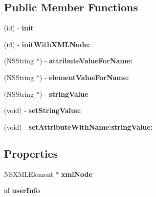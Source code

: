 \subsection*{Public Member Functions}
\begin{DoxyCompactItemize}
\item 
\hypertarget{interface_c_g_xml_node_ad90b29bc2d65ce4b349ecab18db6a3e4}{(id) -\/ {\bfseries init}}\label{interface_c_g_xml_node_ad90b29bc2d65ce4b349ecab18db6a3e4}

\item 
\hypertarget{interface_c_g_xml_node_acee52fdfbc894dfc20d3dcc5e2ff942a}{(id) -\/ {\bfseries init\-With\-X\-M\-L\-Node\-:}}\label{interface_c_g_xml_node_acee52fdfbc894dfc20d3dcc5e2ff942a}

\item 
\hypertarget{interface_c_g_xml_node_acd08c6d9d64e3c7dee41be31543db633}{(N\-S\-String $\ast$) -\/ {\bfseries attribute\-Value\-For\-Name\-:}}\label{interface_c_g_xml_node_acd08c6d9d64e3c7dee41be31543db633}

\item 
\hypertarget{interface_c_g_xml_node_a655323c5db995c6f1584e00de2b0cae6}{(N\-S\-String $\ast$) -\/ {\bfseries element\-Value\-For\-Name\-:}}\label{interface_c_g_xml_node_a655323c5db995c6f1584e00de2b0cae6}

\item 
\hypertarget{interface_c_g_xml_node_a176e7da0a7ebf7621b884af50694f3a2}{(N\-S\-String $\ast$) -\/ {\bfseries string\-Value}}\label{interface_c_g_xml_node_a176e7da0a7ebf7621b884af50694f3a2}

\item 
\hypertarget{interface_c_g_xml_node_a1dcaecf10b29c55303235f5af3ea7a0e}{(void) -\/ {\bfseries set\-String\-Value\-:}}\label{interface_c_g_xml_node_a1dcaecf10b29c55303235f5af3ea7a0e}

\item 
\hypertarget{interface_c_g_xml_node_a4de8210ccd53cd0efff2c2ffb236ad9d}{(void) -\/ {\bfseries set\-Attribute\-With\-Name\-:string\-Value\-:}}\label{interface_c_g_xml_node_a4de8210ccd53cd0efff2c2ffb236ad9d}

\end{DoxyCompactItemize}
\subsection*{Properties}
\begin{DoxyCompactItemize}
\item 
\hypertarget{interface_c_g_xml_node_abf4de5c626ff62dd5b87b9ce92e0a162}{N\-S\-X\-M\-L\-Element $\ast$ {\bfseries xml\-Node}}\label{interface_c_g_xml_node_abf4de5c626ff62dd5b87b9ce92e0a162}

\item 
\hypertarget{interface_c_g_xml_node_abe2618247082b4f7172ee70be264bfad}{id {\bfseries user\-Info}}\label{interface_c_g_xml_node_abe2618247082b4f7172ee70be264bfad}

\end{DoxyCompactItemize}


